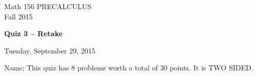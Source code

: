 \documentclass[11pt]{article}
\begin{document}
\begin{center}
\vspace{2in}

\huge{Math 156 PRECALCULUS \\
Fall 2015}

\vfill

\huge{\bf{Quiz 3 -- Retake}}\\

\vspace{0.5in}

\large{Tuesday, September 29, 2015}\\

\vfill


{\huge{Name:{\underline{\hspace{2in}}}}}
\vfill
This quiz has 8 problems worth a total of 30 points. It is TWO SIDED. 
\vfill
\end{center}
\newpage
\restoregeometry
\end{document}
